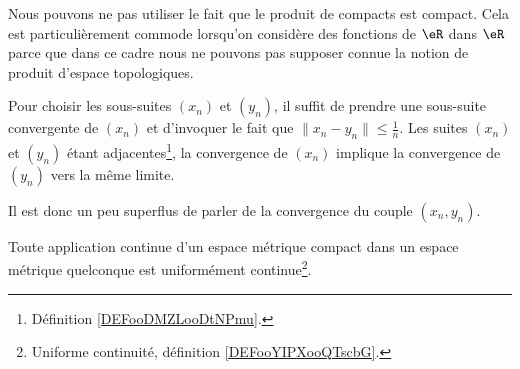 \begin{remark}
    Nous pouvons ne pas utiliser le fait que le produit de compacts est compact. Cela est particulièrement commode lorsqu'on considère des fonctions de \( \eR\) dans \( \eR\) parce que dans ce cadre nous ne pouvons pas supposer connue la notion de produit d'espace topologiques.

    Pour choisir les sous-suites \( (x_n)\) et \( (y_n)\), il suffit de prendre une sous-suite convergente de \( (x_n)\) et d'invoquer le fait que \( \| x_n-y_n \|\leq \frac{1}{ n }\). Les suites \( (x_n)\) et \( (y_n)\) étant adjacentes\footnote{Définition \ref{DEFooDMZLooDtNPmu}.}, la convergence de \( (x_n)\) implique la convergence de \( (y_n)\) vers la même limite.

    Il est donc un peu superflus de parler de la convergence du couple \( (x_n,y_n)\).
\end{remark}

\begin{proposition}     \label{PROPooBWUFooYhMlDp}
    Toute application continue d'un espace métrique compact dans un espace métrique quelconque est uniformément continue\footnote{Uniforme continuité, définition \ref{DEFooYIPXooQTscbG}.}.
\end{proposition}

